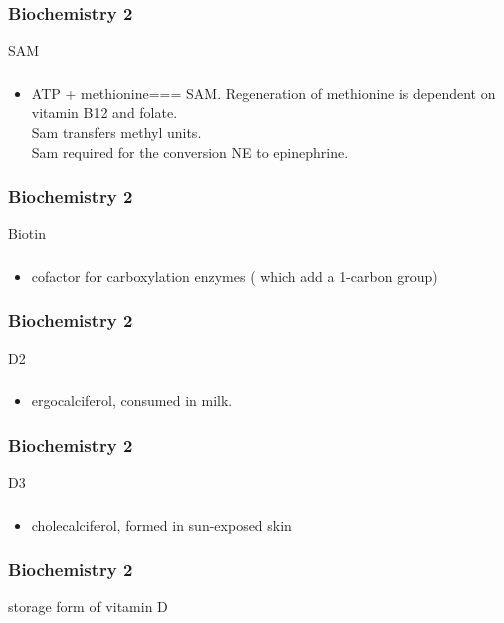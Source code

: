 \documentclass[11pt]{beamer}
\begin{document}
\begin{frame}
 \frametitle{Biochemistry 2}
SAM 
\end{frame}

\begin{frame}
 \frametitle{}
\begin{itemize}
\item ATP + methionine=== SAM. Regeneration of methionine is dependent on vitamin B12 and folate.  \\ Sam transfers methyl units.  \\ Sam required for the conversion NE to epinephrine. 
\end{itemize}
\end{frame}

\begin{frame}
 \frametitle{Biochemistry 2}
Biotin 
\end{frame}

\begin{frame}
 \frametitle{}
\begin{itemize}
\item cofactor for carboxylation enzymes ( which add a 1-carbon group)
\end{itemize}
\end{frame}

\begin{frame}
 \frametitle{Biochemistry 2}
D2
\end{frame}

\begin{frame}
 \frametitle{}
\begin{itemize}
\item ergocalciferol, consumed in milk.
\end{itemize}
\end{frame}

\begin{frame}
 \frametitle{Biochemistry 2}
D3 
\end{frame}

\begin{frame}
 \frametitle{}
\begin{itemize}
\item cholecalciferol, formed in sun-exposed skin
\end{itemize}
\end{frame}

\begin{frame}
 \frametitle{Biochemistry 2}
storage form of vitamin D 
\end{frame}
\end{document}
